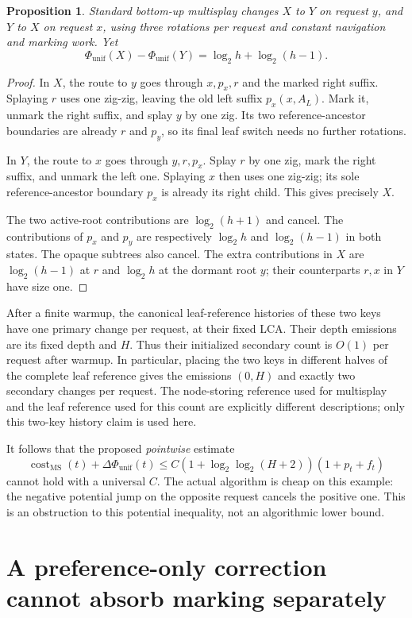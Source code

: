 \documentclass[11pt]{article}
\newtheorem{proposition}[lemma]{Proposition}
\newcommand{\lgx}{\log_2}
\newcommand{\MS}{\operatorname{MS}}
\newcommand{\phiu}{\Phi_{\mathrm{unif}}}
\begin{document}
\begin{proposition}
Standard bottom-up multisplay changes $X$ to $Y$ on request $y$, and
$Y$ to $X$ on request $x$, using three rotations per request and constant
navigation and marking work. Yet
\[
 \phiu(X)-\phiu(Y)=\lgx h+\lgx(h-1).
\]
\end{proposition}
\begin{proof}
In $X$, the route to $y$ goes through $x,p_x,r$ and the marked right
suffix. Splaying $r$ uses one zig-zig, leaving the old left suffix
$p_x(x,A_L)$. Mark it, unmark the right suffix, and splay $y$ by one
zig. Its two reference-ancestor boundaries are already $r$ and $p_y$,
so its final leaf switch needs no further rotations.

In $Y$, the route to $x$ goes through $y,r,p_x$. Splay $r$ by one zig,
mark the right suffix, and unmark the left one. Splaying $x$ then uses
one zig-zig; its sole reference-ancestor boundary $p_x$ is already its
right child. This gives precisely $X$.

The two active-root contributions are $\lgx(h+1)$ and cancel. The
contributions of $p_x$ and $p_y$ are respectively $\lgx h$ and
$\lgx(h-1)$ in both states. The opaque subtrees also cancel. The extra
contributions in $X$ are $\lgx(h-1)$ at $r$ and $\lgx h$ at the dormant
root $y$; their counterparts $r,x$ in $Y$ have size one.
\end{proof}

After a finite warmup, the canonical leaf-reference histories of these
two keys have one primary change per request, at their fixed LCA.
Their depth emissions are its fixed depth and $H$. Thus their initialized
secondary count is $O(1)$ per request after warmup. In particular, placing
the two keys in different halves of the complete leaf reference gives
the emissions $(0,H)$ and exactly two secondary changes per request.
The node-storing reference used for multisplay and the leaf reference
used for this count are explicitly different descriptions; only this
two-key history claim is used here.

It follows that the proposed \emph{pointwise} estimate
\[
 \operatorname{cost}_{\MS}(t)+\Delta\phiu(t)
 \le C(1+\lgx\lgx(H+2))(1+p_t+f_t)
\]
cannot hold with a universal $C$. The actual algorithm is cheap on this
example: the negative potential jump on the opposite request cancels the
positive one. This is an obstruction to this potential inequality, not
an algorithmic lower bound.

\section{A preference-only correction cannot absorb marking separately}
\end{document}
